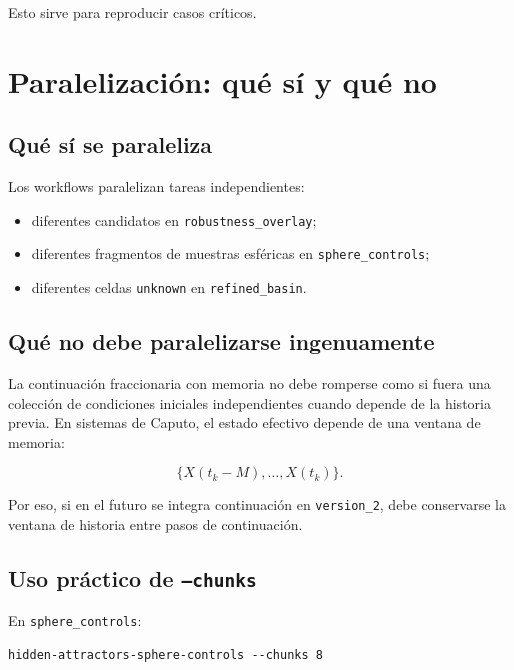 \documentclass[11pt,letterpaper]{article}
\begin{document}
Esto sirve para reproducir casos críticos.

\section{Paralelización: qué sí y qué no}

\subsection{Qué sí se paraleliza}

Los workflows paralelizan tareas independientes:

\begin{itemize}
  \item diferentes candidatos en \texttt{robustness\_overlay};
  \item diferentes fragmentos de muestras esféricas en \texttt{sphere\_controls};
  \item diferentes celdas \texttt{unknown} en \texttt{refined\_basin}.
\end{itemize}

\subsection{Qué no debe paralelizarse ingenuamente}

La continuación fraccionaria con memoria no debe romperse como si fuera una colección de condiciones iniciales independientes cuando depende de la historia previa. En sistemas de Caputo, el estado efectivo depende de una ventana de memoria:

\begin{equation}
\{X(t_k-M),\ldots,X(t_k)\}.
\end{equation}

Por eso, si en el futuro se integra continuación en \texttt{version\_2}, debe conservarse la ventana de historia entre pasos de continuación.

\subsection{Uso práctico de \texttt{--chunks}}

En \texttt{sphere\_controls}:

\begin{lstlisting}[style=terminal]
hidden-attractors-sphere-controls --chunks 8
\end{lstlisting}
\end{document}
